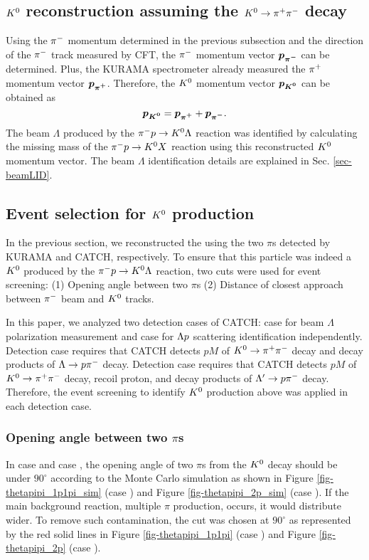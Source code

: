 \clearpage
\subsection{$K^{0}$ reconstruction assuming the $K^0 \to \pi^+ \pi^-$ decay}
Using the $\pi^{-}$ momentum determined in the previous subsection and the direction of the $\pi^{-}$ track measured by CFT, the $\pi^{-}$ momentum vector $\bm{p_{\pi^{-}}}$ can be determined. Plus, the KURAMA spectrometer already measured the $\pi^{+}$ momentum vector $\bm{p_{\pi^{+}}}$. Therefore, the $K^{0}$ momentum vector $\bm{p_{K^{0}}}$ can be obtained as
\begin{equation}
  \bm{p_{K^{0}}} = \bm{p_{\pi^{+}}} + \bm{p_{\pi^{-}}}.
\end{equation}
The beam $\Lambda$ produced by the $\pi^- p \to K^0 \Lambda$ reaction was identified by calculating the missing mass of the $\pi^- p \to K^0 X$ reaction using this reconstructed $K^{0}$ momentum vector. The beam $\Lambda$ identification details are explained in Sec. \ref{sec-beamLID}.

\subsection{Event selection for $K^{0}$ production}
\label{sec-Lbeam-EVselect}
In the previous section, we reconstructed the  using the two $\pi$s detected by KURAMA and CATCH, respectively. To ensure that this particle was indeed a $K^{0}$ produced by the $\pi^- p \to K^0 \Lambda$ reaction, two cuts were used for event screening: (1) Opening angle between two $\pi$s (2) Distance of closest approach between $\pi^{-}$ beam and $K^{0}$ tracks. 

In this paper, we analyzed two detection cases of CATCH: case  for beam $\Lambda$ polarization measurement and case  for $\Lambda p$ scattering identification independently. Detection case  requires that CATCH detects $pM$ of $K^0 \to \pi^+ \pi^-$ decay and decay products of $\Lambda\to p\pi^{-}$ decay. Detection case  requires that CATCH detects $pM$ of $K^0 \to \pi^+ \pi^-$ decay, recoil proton, and decay products of $\Lambda'\to p\pi^{-}$ decay. Therefore, the event screening to identify $K^{0}$ production above was applied in each detection case. 




\subsubsection{Opening angle between two $\pi$s}
In case  and case , the opening angle of two $\pi$s from the $K^{0}$ decay should be under $90^{\circ}$ according to the Monte Carlo simulation as shown in Figure \ref{fig-thetapipi_1p1pi_sim} (case ) and Figure \ref{fig-thetapipi_2p_sim} (case ). If the main background reaction, multiple $\pi$ production, occurs, it would distribute wider. To remove such contamination, the cut was chosen at $90^{\circ}$ as represented by the red solid lines in Figure \ref{fig-thetapipi_1p1pi} (case ) and Figure \ref{fig-thetapipi_2p} (case ). 

